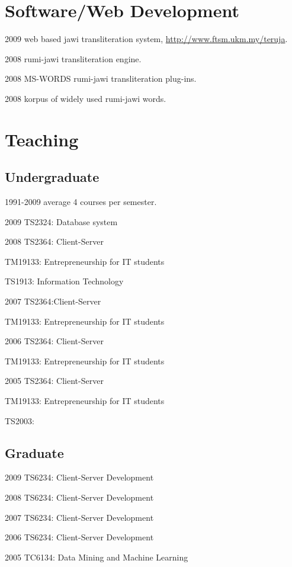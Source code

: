 \documentclass[a4paper]{article}
\begin{document}
\section{Software/Web Development}

\begin{CV}
\item[2009] web based jawi transliteration system, \url{http://www.ftsm.ukm.my/teruja}.
\item[2008] rumi-jawi transliteration engine.
\item[2008] MS-WORDS rumi-jawi transliteration plug-ins.
\item[2008] korpus of widely used rumi-jawi words.
\end{CV}

\section{Teaching}
\subsection*{Undergraduate}
\begin{CV}
\item [1991-2009] average 4 courses per semester.
\item[2009] TS2324: Database system
\item[2008] TS2364: Client-Server
\item TM19133: Entrepreneurship for IT students
\item TS1913: Information Technology
\item[2007] TS2364:Client-Server
\item TM19133: Entrepreneurship for IT students
\item[2006] TS2364: Client-Server
\item TM19133: Entrepreneurship for IT students
\item[2005] TS2364: Client-Server
\item TM19133: Entrepreneurship for IT students
\item TS2003: 
\end{CV}
\subsection*{Graduate}
\begin{CV}
\item[2009] TS6234: Client-Server Development
\item[2008] TS6234: Client-Server Development
\item[2007] TS6234: Client-Server Development
\item[2006] TS6234: Client-Server Development
\item[2005] TC6134: Data Mining and Machine Learning
\end{CV}
\end{document}
